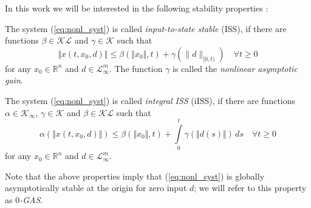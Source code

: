 \documentclass[letterpaper, 10 pt, conference]{ieeeconf}  %
\begin{document}
In this work we will be interested in the following stability properties
\cite{sontag2008}:
\begin{defin}
The system (\ref{eq:nonl_syst}) is called \emph{input-to-state stable}
(ISS), if there are functions $\beta\in\mathcal{K}\mathcal{L}$ and
$\gamma\in\mathcal{K}$ such that 
\[
\Vert x(t,x_{0},d)\Vert\le\beta(\Vert x_{0}\Vert,t)+\gamma(\|d\|_{[0,t)})\quad\forall t\ge0
\]
for any $x_{0}\in\mathbb{R}^{n}$ and $d\in\mathcal{L}_{\infty}^{m}$.
The function $\gamma$ is called the \emph{nonlinear asymptotic gain}.
\end{defin}

\begin{defin}
The system (\ref{eq:nonl_syst}) is called \emph{integral ISS} (iISS),
if there are functions $\alpha\in\mathcal{K}_{\infty}$, $\gamma\in\mathcal{K}$
and $\beta\in\mathcal{K}\mathcal{L}$ such that 
\[
\alpha(\Vert x(t,x_{0},d)\Vert)\le\beta(\Vert x_{0}\Vert,t)+\int\limits _{0}^{t}\gamma(\Vert d(s)\Vert)\,ds\quad\forall t\ge0
\]
for any $x_{0}\in\mathbb{R}^{n}$ and $d\in\mathcal{L}_{\infty}^{m}$.
\end{defin}
Note that the above properties imply that (\ref{eq:nonl_syst}) is
globally asymptotically stable at the origin for zero input $d$; we
will refer to this property as $0$\emph{-GAS}.
\end{document}
